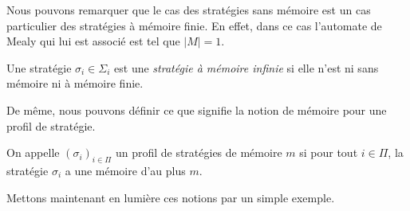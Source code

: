 Nous pouvons remarquer que le cas des stratégies sans mémoire est un cas particulier des stratégies à mémoire finie. En effet, dans ce cas l'automate de Mealy qui lui est associé est tel que $|M| = 1$.\\


\begin{defi}	
	Une stratégie $\sigma _{i} \in \Sigma _{i}$ est une \textit{stratégie à mémoire infinie } si elle n'est ni sans mémoire ni à mémoire finie.
\end{defi}

De même, nous pouvons définir ce que signifie la notion de mémoire pour une profil de stratégie.

\begin{defi}
	On appelle $(\sigma_i)_{i\in \Pi}$ un profil de stratégies de mémoire $m$ si pour tout $i\in \Pi$, la stratégie $\sigma_i$ a une mémoire d'au plus $m$.
\end{defi}

Mettons maintenant en lumière  ces notions par un simple exemple.

